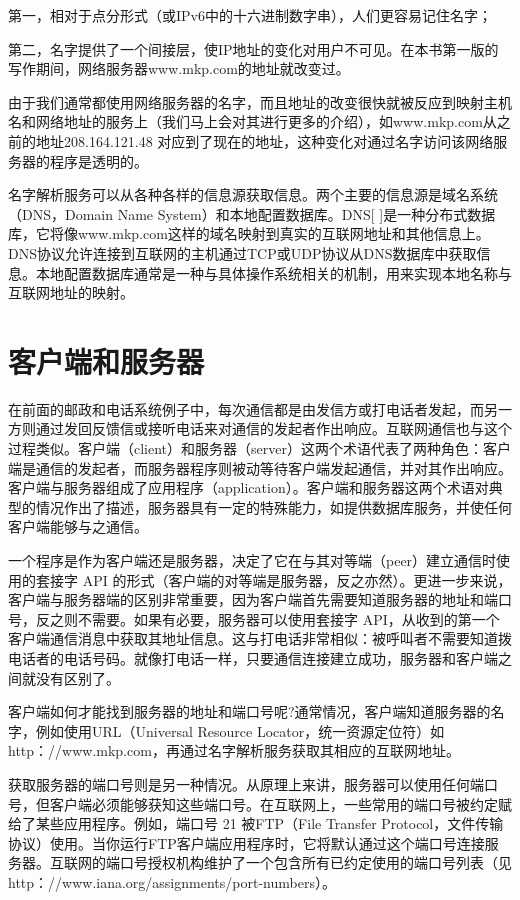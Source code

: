 		第一，相对于点分形式（或IPv6中的十六进制数字串），人们更容易记住名字；

		第二，名字提供了一个间接层，使IP地址的变化对用户不可见。在本书第一版的写作期间，网络服务器www.mkp.com的地址就改变过。

		由于我们通常都使用网络服务器的名字，而且地址的改变很快就被反应到映射主机名和网络地址的服务上（我们马上会对其进行更多的介绍），如www.mkp.com从之前的地址208.164.121.48 对应到了现在的地址，这种变化对通过名字访问该网络服务器的程序是透明的。

		名字解析服务可以从各种各样的信息源获取信息。两个主要的信息源是域名系统（DNS，Domain Name System）和本地配置数据库。DNS[ ]是一种分布式数据库，它将像www.mkp.com这样的域名映射到真实的互联网地址和其他信息上。DNS协议允许连接到互联网的主机通过TCP或UDP协议从DNS数据库中获取信息。本地配置数据库通常是一种与具体操作系统相关的机制，用来实现本地名称与互联网地址的映射。

	\section{客户端和服务器}
		在前面的邮政和电话系统例子中，每次通信都是由发信方或打电话者发起，而另一方则通过发回反馈信或接听电话来对通信的发起者作出响应。互联网通信也与这个过程类似。客户端（client）和服务器（server）这两个术语代表了两种角色：客户端是通信的发起者，而服务器程序则被动等待客户端发起通信，并对其作出响应。客户端与服务器组成了应用程序（application）。客户端和服务器这两个术语对典型的情况作出了描述，服务器具有一定的特殊能力，如提供数据库服务，并使任何客户端能够与之通信。

		一个程序是作为客户端还是服务器，决定了它在与其对等端（peer）建立通信时使用的套接字 API 的形式（客户端的对等端是服务器，反之亦然）。更进一步来说，客户端与服务器端的区别非常重要，因为客户端首先需要知道服务器的地址和端口号，反之则不需要。如果有必要，服务器可以使用套接字 API，从收到的第一个客户端通信消息中获取其地址信息。这与打电话非常相似：被呼叫者不需要知道拨电话者的电话号码。就像打电话一样，只要通信连接建立成功，服务器和客户端之间就没有区别了。

		客户端如何才能找到服务器的地址和端口号呢?通常情况，客户端知道服务器的名字，例如使用URL（Universal Resource Locator，统一资源定位符）如http：//www.mkp.com，再通过名字解析服务获取其相应的互联网地址。

		获取服务器的端口号则是另一种情况。从原理上来讲，服务器可以使用任何端口号，但客户端必须能够获知这些端口号。在互联网上，一些常用的端口号被约定赋给了某些应用程序。例如，端口号 21 被FTP（File Transfer Protocol，文件传输协议）使用。当你运行FTP客户端应用程序时，它将默认通过这个端口号连接服务器。互联网的端口号授权机构维护了一个包含所有已约定使用的端口号列表（见http：//www.iana.org/assignments/port-numbers）。

